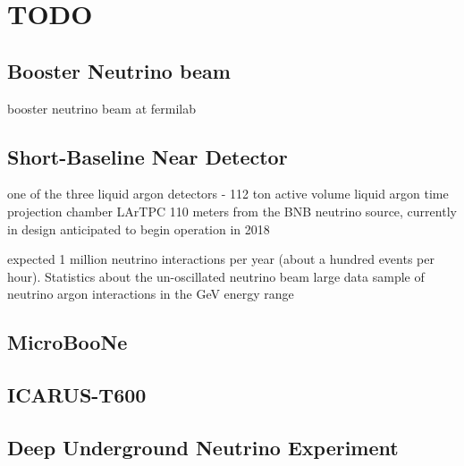 \chapter{TODO}

\section{Booster Neutrino beam}
booster neutrino beam at fermilab

\section{Short-Baseline Near Detector}
one of the three liquid argon detectors - 112 ton active volume liquid argon time projection chamber LArTPC
110 meters from the BNB neutrino source, currently in design anticipated to begin operation in 2018

expected 1 million neutrino interactions per year (about a hundred events per hour).
Statistics about the un-oscillated neutrino beam
large data sample of neutrino argon interactions in the GeV energy range

\section{MicroBooNe}

\section{ICARUS-T600}

\section{Deep Underground Neutrino Experiment}

